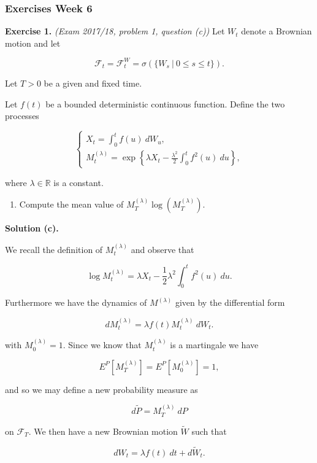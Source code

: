 \documentclass[
]{article}
\providecommand{\tightlist}{%
  \setlength{\itemsep}{0pt}\setlength{\parskip}{0pt}}
\begin{document}
\hypertarget{exercises-week-6}{%
\subsubsection{Exercises Week 6}\label{exercises-week-6}}

\textbf{Exercise 1.} \emph{(Exam 2017/18, problem 1, question (c))} Let
\(W_t\) denote a Brownian motion and let

\[
\mathcal{F}_t=\mathcal{F}_t^W=\sigma(\{W_s\ \vert\ 0\le s\le t\}).
\]

Let \(T>0\) be a given and fixed time.

Let \(f(t)\) be a bounded deterministic continuous function. Define the
two processes

\[
\begin{cases}
X_t=\int_0^tf(u)\ dW_u,\\
M^{(\lambda)}_t=\exp\left\{\lambda X_t-\frac{\lambda^2}{2}\int_0^t f^2(u)\ du\right\},
\end{cases}
\]

where \(\lambda\in\mathbb{R}\) is a constant.

\begin{enumerate}
\def\labelenumi{\alph{enumi}.}
\setcounter{enumi}{2}
\tightlist
\item
  Compute the mean value of \(M^{(\lambda)}_T\log(M^{(\lambda)}_T)\).
\end{enumerate}

\textbf{Solution (c).}

We recall the definition of \(M_t^{(\lambda)}\) and observe that

\[
\log M_t^{(\lambda)}=\lambda X_t-\frac{1}{2}\lambda ^2\int_0^t f^2(u)\ du.
\]

Furthermore we have the dynamics of \(M^{(\lambda)}\) given by the
differential form

\[
dM_t^{(\lambda)}=\lambda f(t)M_t^{(\lambda)}\ dW_t.
\]

with \(M_0^{(\lambda)}=1\). Since we know that \(M_t^{(\lambda)}\) is a
martingale we have

\[
E^P[M_T^{(\lambda)}]=E^P[M_0^{(\lambda)}]=1,
\]

and so we may define a new probability measure as

\[
d\tilde{P}=M_T^{(\lambda)}\ dP
\]

on \(\mathcal{F}_T\). We then have a new Brownian motion \(\tilde{W}\)
such that

\[
dW_t=\lambda f(t)\ dt + d\tilde{W}_t.
\]
\end{document}

